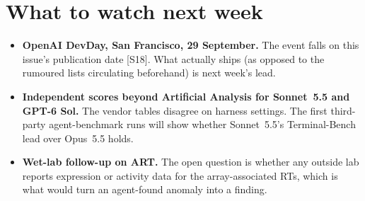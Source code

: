 \documentclass[11pt,a4paper]{article}
\newcommand{\srcref}[1]{\textcolor{brandaccent}{[S#1]}}
\begin{document}
\section{What to watch next week}
\begin{itemize}
  \item \textbf{OpenAI DevDay, San Francisco, 29 September.} The event falls on this issue's
  publication date \srcref{18}. What actually ships (as opposed to the rumoured lists circulating
  beforehand) is next week's lead.
  \item \textbf{Independent scores beyond Artificial Analysis for Sonnet~5.5 and GPT-6 Sol.} The
  vendor tables disagree on harness settings. The first third-party agent-benchmark runs will
  show whether Sonnet~5.5's Terminal-Bench lead over Opus~5.5 holds.
  \item \textbf{Wet-lab follow-up on ART.} The open question is whether any outside lab reports
  expression or activity data for the array-associated RTs, which is what would turn an
  agent-found anomaly into a finding.
\end{itemize}

\clearpage
\end{document}

